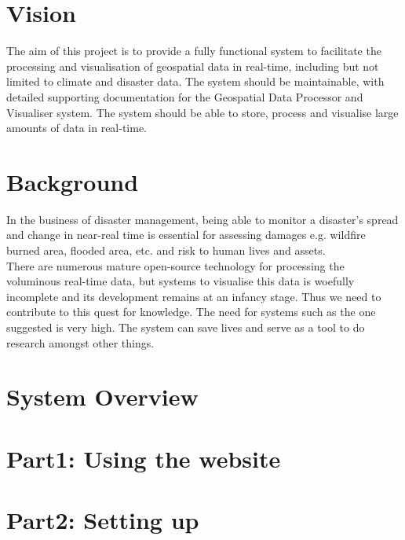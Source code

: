 \documentclass[a4paper,12pt]{article}
\begin{document}
	\section{Vision}
	The aim of this project is to provide a fully functional system to facilitate the processing and visualisation of geospatial data in real-time, including but not limited to climate and disaster data. The system should be maintainable, with detailed supporting documentation for the Geospatial Data Processor and Visualiser system. The system should be able to store, process and visualise large amounts of data in real-time.
	
	\section{Background}
	In the business of disaster management, being able to monitor a disaster's spread and change in near-real time is essential for assessing damages e.g. wildfire burned area, flooded area, etc. and risk to human lives and assets.\\
	There are numerous mature open-source technology for processing the voluminous real-time data, but systems to visualise this data is woefully incomplete and its development remains at an infancy stage. Thus we need to contribute to this quest for knowledge. The need for systems such as the one suggested is very high. The system can save lives and serve as a tool to do research amongst other things.
	
	\section{System Overview}		
	
		
	\section{Part1: Using the website }
	
		
	
	\section{Part2: Setting up}
	
	
	
	
\end{document}
